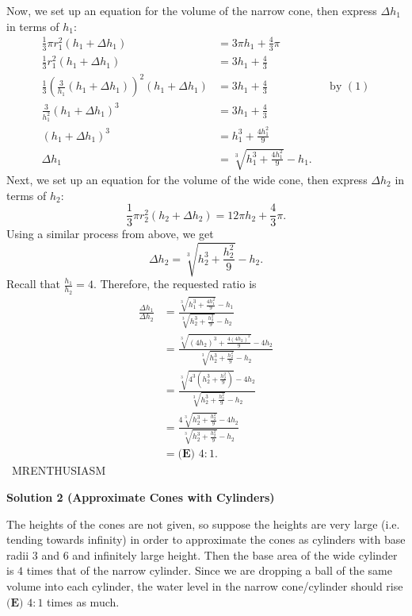 \begin{enumerate}
 Now, we set up an equation for the volume of the narrow cone, then express $\Delta h_1$ in terms of $h_1:$
 \begin{align*} \frac13\pi r_1^2(h_1+\Delta h_1) &= 3\pi h_1+\frac43\pi \\ \frac13 r_1^2(h_1+\Delta h_1) &= 3h_1+\frac43 \\ \frac13\left(\frac{3}{h_1}(h_1+\Delta h_1)\right)^2(h_1+\Delta h_1) &= 3h_1+\frac43 &&\text{by }(1) \\ \frac{3}{h_1^2}(h_1+\Delta h_1)^3 &= 3h_1+\frac43 \\ (h_1+\Delta h_1)^3 &= h_1^3 + \frac{4h_1^2}{9} \\ \Delta h_1 &= \sqrt[3]{h_1^3 + \frac{4h_1^2}{9}}-h_1. \end{align*}
Next, we set up an equation for the volume of the wide cone, then express $\Delta h_2$ in terms of $h_2:$
 \[\frac13\pi r_2^2(h_2+\Delta h_2) = 12\pi h_2+\frac43\pi.\]Using a similar process from above, we get 
 \[\Delta h_2 = \sqrt[3]{h_2^3+\frac{h_2^2}{9}}-h_2.\]Recall that $\frac{h_1}{h_2}=4.$ Therefore, the requested ratio is 
 \begin{align*} \frac{\Delta h_1}{\Delta h_2}&=\frac{\sqrt[3]{h_1^3 + \frac{4h_1^2}{9}}-h_1}{\sqrt[3]{h_2^3+\frac{h_2^2}{9}}-h_2} \\ &=\frac{\sqrt[3]{(4h_2)^3 + \frac{4(4h_2)^2}{9}}-4h_2}{\sqrt[3]{h_2^3+\frac{h_2^2}{9}}-h_2} \\ &=\frac{\sqrt[3]{4^3\left(h_2^3 + \frac{h_2^2}{9}\right)}-4h_2}{\sqrt[3]{h_2^3+\frac{h_2^2}{9}}-h_2} \\ &=\frac{4\sqrt[3]{h_2^3+\frac{h_2^2}{9}}-4h_2}{\sqrt[3]{h_2^3+\frac{h_2^2}{9}}-h_2} \\ &=\boxed{\textbf{(E) }4:1}. \end{align*}
~MRENTHUSIASM

 



\textbf{Solution 2 (Approximate Cones with Cylinders)}

The heights of the cones are not given, so suppose the heights are very large (i.e. tending towards infinity) in order to approximate the cones as cylinders with base radii $3$ and $6$ and infinitely large height. Then the base area of the wide cylinder is $4$ times that of the narrow cylinder. Since we are dropping a ball of the same volume into each cylinder, the water level in the narrow cone/cylinder should rise $\boxed{\textbf{(E) } 4:1}$ times as much.

 




\end{enumerate}
